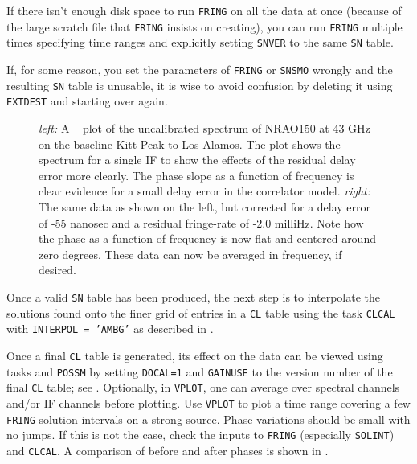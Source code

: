 If there isn't enough disk space to run {\tt FRING} on all the data at
once (because of the large scratch file that {\tt FRING} insists on
creating), you can run {\tt FRING} multiple times specifying time
ranges and explicitly setting {\tt SNVER} to the same {\tt SN} table.

If, for some reason, you set the parameters of {\tt FRING} or
{\tt SNSMO} wrongly and the resulting {\tt SN} table is unusable, it
is wise to avoid confusion by deleting it using {\tt EXTDEST} and
starting over again.

\begin{figure}
\centering
\caption[Spectrum before and after calibration]{{\it left:\/} A {\tt
{}} plot of the uncalibrated spectrum of NRAO150 at 43 GHz
on the baseline Kitt Peak to Los Alamos. The plot shows the spectrum
for a single IF to show the effects of the residual delay error more
clearly.  The phase slope as a function of frequency is clear evidence
for a small delay error in the correlator model.  {\it right:\/} The
same data as shown on the left, but corrected for a delay error of -55
nanosec and a residual fringe-rate of -2.0 milliHz.  Note how the
phase as a function of frequency is now flat and centered around zero
degrees.  These data can now be averaged in frequency, if desired.
}
\label{fig:VLBbeforeafter}
\end{figure}

Once a valid {\tt SN} table has been produced, the next step is to
interpolate the solutions found onto the finer grid of entries in a
{\tt CL} table using the task {\tt CLCAL} with {\tt INTERPOL = 'AMBG'}
as described in .

Once a final {\tt CL} table is generated, its effect on the data can
be viewed using tasks {\tt {}} and {\tt POSSM} by setting
{\tt DOCAL=1} and {\tt GAINUSE} to the version number of the final
{\tt CL} table; see .  Optionally, in {\tt VPLOT}, one
can average over spectral channels and/or IF channels before plotting.
Use {\tt VPLOT} to plot a time range covering a few {\tt FRING}
solution intervals on a strong source.  Phase variations should be
small with no jumps.  If this is not the case, check the inputs to
{\tt FRING} (especially {\tt SOLINT}) and {\tt CLCAL}\@.  A comparison
of before and after phases is shown in .


